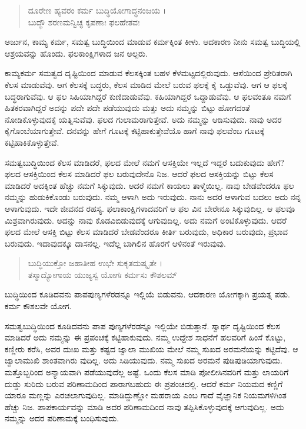 \begin{verse}
ದೂರೇಣ ಹ್ಯವರಂ ಕರ್ಮ ಬುದ್ಧಿಯೋಗಾದ್ಧನಂಜಯ ।\\ಬುದ್ಧೌ ಶರಣಮನ್ವಿಚ್ಛ ಕೃಪಣಾಃ ಫಲಹೇತವಃ 
\end{verse}

{\small ಅರ್ಜುನ, ಕಾಮ್ಯ ಕರ್ಮ, ಸಮತ್ವ ಬುದ್ಧಿಯಿಂದ ಮಾಡುವ ಕರ್ಮಕ್ಕಿಂತ ಕೀಳು. ಆದಕಾರಣ ನೀನು ಸಮತ್ವ ಬುದ್ಧಿಯಲ್ಲಿ ಆಶ್ರಯವನ್ನು ಹೊಂದು. ಫಲಕಾಂಕ್ಷಿಗಳಾದ ಜನ ಅಲ್ಪರು.}

ಕಾಮ್ಯಕರ್ಮ ಸಮತ್ವದ ದೃಷ್ಟಿಯಿಂದ ಮಾಡುವ ಕೆಲಸಕ್ಕಿಂತ ಬಹಳ ಕೆಳಮಟ್ಟದಲ್ಲಿರುವುದು. ಆಸೆಯಿಂದ ಪ್ರೇರಿತರಾಗಿ ಕೆಲಸ ಮಾಡುವೆವು. ಆಗ ಕೆಲಸಕ್ಕೆ ಬದ್ಧರು, ಕೆಲಸ ಮಾಡಿದ ಮೇಲೆ ಬರುವ ಫಲಕ್ಕೆ ಕೈ ಒಡ್ಡುವೆವು. ಆಗ ಆ ಫಲಕ್ಕೆ ಬದ್ಧರಾಗುವೆವು. ಆ ಫಲ ಸಿಹಿಯಾಗಿದ್ದರೆ ಕುಣಿದಾಡುವೆವು. ಕಹಿಯಾಗಿದ್ದರೆ ಒದ್ದಾಡುವೆವು. ಆ ಫಲವಂತೂ ನಮಗೆ ಹಿತಕರವಾಗಿದ್ದರೆ ಅದನ್ನು ಪದೇ ಪದೇ ಪಡೆಯುವುದು ಮತ್ತು ಅದು ನಮ್ಮನ್ನು ಬಿಟ್ಟು ಹೋಗದಂತೆ ನೋಡಿಕೊಳ್ಳುವುದಕ್ಕೆ ಯತ್ನಿಸುವೆವು. ಫಲದ ಗುಲಾಮರಾಗುತ್ತೇವೆ. ಅದು ನಮ್ಮನ್ನು ಆಡಿಸುವುದು. ನಾವು ಅದರ ಕೈಗೊಂಬೆಯಾಗುತ್ತೇವೆ. ದನವನ್ನು ಹೇಗೆ ಗೂಟಕ್ಕೆ ಕಟ್ಟಿಹಾಕುತ್ತೇವೆಯೊ ಹಾಗೆ ನಾವು ಫಲವೆಂಬ ಗೂಟಕ್ಕೆ ಕಟ್ಟಿಹಾಕಿಕೊಳ್ಳುತ್ತೇವೆ.

ಸಮತ್ವಬುದ್ಧಿಯಿಂದ ಕೆಲಸ ಮಾಡಿದರೆ, ಫಲದ ಮೇಲೆ ನಮಗೆ ಆಸಕ್ತಿಯೇ ಇಲ್ಲದೆ ಇದ್ದರೆ ಬದುಕುವುದು ಹೇಗೆ? ಫಲದ ಆಸಕ್ತಿಯಿಂದ ಕೆಲಸ ಮಾಡಿದರೆ ಫಲ ಬರುವುದೇನೊ ನಿಜ. ಆದರೆ ಫಲದ ಆಸಕ್ತಿಯನ್ನು ಬಿಟ್ಟು ಕೆಲಸ ಮಾಡಿದರೆ ಅದಕ್ಕಿಂತ ಹೆಚ್ಚು ನಮಗೆ ಸಿಕ್ಕುವುದು. ಆದರೆ ನಮಗೆ ಕಾಯಲು ತಾಳ್ಮೆಯಿಲ್ಲ. ನಾವು ಬೇಡವೆಂದರೂ ಫಲ ನಮ್ಮನ್ನು ಹುಡುಕಿಕೊಂಡು ಬರುವುದು. ನಮ್ಮ ಆಳಾಗಿ ಅದು ಇರುವುದು. ನಾನು ಅದರ ಆಳಾಗುವ ಬದಲು ಅದು ನನ್ನ ಆಳಾಗುವುದು. ಇದೇ ಜೀವನದ ರಹಸ್ಯ. ಫಲಾಕಾಂಕ್ಷಿಗಳಾದವರಿಗೆ ಆ ಫಲ ವಿನ ಬೇರೇನೂ ಸಿಕ್ಕುವುದಿಲ್ಲ. ಆ ಫಲವೂ ಮಿಶ್ರವಾಗಿರುವುದು. ಅದನ್ನು ನಾವು ಕೊಡವಿಬಿಡುವುದಕ್ಕೆ ಆಗುವುದಿಲ್ಲ. ಅದು ನಮಗೆ ಅಂಟಿಕೊಳ್ಳುವುದು. ಆದರೆ ಫಲದ ಮೇಲೆ ಆಸಕ್ತಿ ಬಿಟ್ಟು ಕೆಲಸ ಮಾಡಿದರೆ ಬೇಡವೆಂದರೂ ಕೀರ್ತಿ ಬರುವುದು, ಅಧಿಕಾರ ಬರುವುದು, ಪ್ರಭಾವ ಬರುವುದು. ಇದಾವುದಕ್ಕೂ ದಾಸನಲ್ಲ. ಇದೆಲ್ಲ ಬಾಗಿಲಿನ ಹೊರಗೆ ಆಳಿನಂತೆ ಇರುವುವು.

\begin{verse}
ಬುದ್ಧಿಯುಕ್ತೋ ಜಹಾತೀಹ ಉಭೇ ಸುಕೃತದುಷ್ಕೃತೇ ।\\ತಸ್ಮಾದ್ಯೋಗಾಯ ಯುಜ್ಯಸ್ವ ಯೋಗಃ ಕರ್ಮಸು ಕೌಶಲಮ್ 
\end{verse}

{\small ಬುದ್ಧಿಯಿಂದ ಕೂಡಿದವನು ಪಾಪಪುಣ್ಯಗಳೆರಡನ್ನೂ ಇಲ್ಲಿಯೆ ಬಿಡುವನು. ಆದಕಾರಣ ಯೋಗಕ್ಕಾಗಿ ಪ್ರಯತ್ನ ಪಡು. ಕರ್ಮ ಕೌಶಲವೇ ಯೋಗ.}

ಸಮತ್ವಬುದ್ಧಿಯಿಂದ ಕೂಡಿದವನು ಪಾಪ ಪುಣ್ಯಗಳೆರಡನ್ನೂ ಇಲ್ಲಿಯೇ ಬಿಡುತ್ತಾನೆ. ಸ್ವಾರ್ಥ ದೃಷ್ಟಿಯಿಂದ ಕೆಲಸ ಮಾಡಿದರೆ ಅದು ನಮ್ಮನ್ನು ಈ ಪ್ರಪಂಚಕ್ಕೆ ಕಟ್ಟಿಹಾಕುವುದು. ನಮ್ಮ ಉದ್ದೇಶ ಸಾಧನೆಗೆ ಹಲವರಿಗೆ ಹಿಂಸೆ ಕೊಟ್ಟು, ಕಣ್ಣೀರು ಕರೆಸಿ, ಅವರ ದುಃಖ ಮತ್ತು ಕಷ್ಟದ ಜ್ವಾಲಾ ಮುಖಿಯ ಮೇಲೆ ನಮ್ಮ ಸುಖದ ಅರಮನೆಯನ್ನು ಕಟ್ಟಿದೆವು. ಆ ಜ್ವಾಲಾಮುಖಿ ಶಾಂತವಾಗಿರು ವುದಿಲ್ಲ. ಅದು ಸಿಡಿಯುವುದು. ನಮ್ಮ ಸುಖದ ಅರಮನೆ ಪುಡಿಪುಡಿಯಾಗುವುದು. ಮತ್ತೊಬ್ಬರಿಂದ ಅನ್ಯಾಯವಾಗಿ ಪಡೆಯುವುದೆಲ್ಲ ಅಷ್ಟೆ. ಒಂದು ಕೆಲಸ ಮಾಡಿ ಪೋಲೀಸಿನವರಿಗೆ ಮತ್ತು ಲಾಯರಿಗೆ ದುಡ್ಡು ಸುರಿದು ಬರುವ ಪರಿಣಾಮದಿಂದ ಪಾರಾಗಬಹುದು ಈ ಪ್ರಪಂಚದಲ್ಲಿ. ಆದರೆ ಕರ್ಮ ನಿಯಮದ ಕಣ್ಣಿಗೆ ಯಾರೂ ಮಣ್ಣನ್ನು ಎರಚಲಾಗುವುದಿಲ್ಲ. ಮಾಡಿದ್ದುಣ್ಣೋ ಮಹರಾಯ ಎಂಬ ಗಾದೆ ವೈಜ್ಞಾನಿಕ ನಿಯಮಗಳಿಗಿಂತ ಹೆಚ್ಚು ನಿಜ. ಪಾಪಕಾರ್ಯವನ್ನು ಮಾಡಿ ಅದರ ಪರಿಣಾಮದಿಂದ ನಾವು ತಪ್ಪಿಸಿಕೊಳ್ಳುವುದಕ್ಕೆ ಆಗುವುದಿಲ್ಲ. ಅದು ನಮ್ಮನ್ನು ಅದರ ಪರಿಣಾಮಕ್ಕೆ ಬಂಧಿಸುವುದು.

